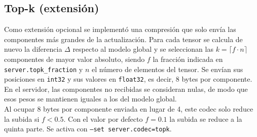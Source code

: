 \subsection{Top-k (extensión)}
Como extensión opcional se implementó una compresión que solo envía las componentes más grandes de la
actualización. Para cada tensor se calcula de nuevo la diferencia $\Delta$ respecto al modelo global y se
seleccionan las $k = \lceil f \cdot n \rceil$ componentes de mayor valor absoluto, siendo $f$ la fracción indicada
en \texttt{server.topk\_fraction} y $n$ el número de elementos del tensor. Se envían sus posiciones en
\texttt{int32} y sus valores en \texttt{float32}, es decir, 8 bytes por componente. En el servidor, las componentes
no recibidas se consideran nulas, de modo que esos pesos se mantienen iguales a los del modelo global.
\\

Al ocupar 8 bytes por componente enviada en lugar de 4, este codec solo reduce la subida si $f < 0.5$. Con el valor
por defecto $f = 0.1$ la subida se reduce a la quinta parte. Se activa con \texttt{--set server.codec=topk}.